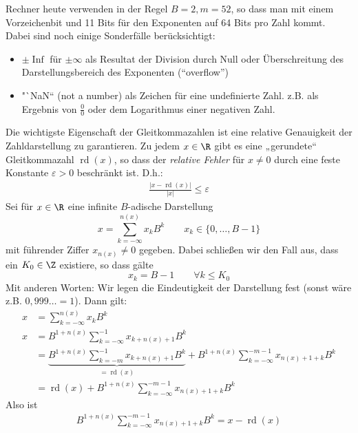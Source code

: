 \documentclass{mycourse}
\DeclareMathOperator{\Inf}{Inf}
\DeclareMathOperator{\rd}{rd}
\begin{document}
Rechner heute verwenden in der Regel $B=2, m=52$, so dass man mit  einem Vorzeichenbit und 11 Bits für den Exponenten auf 64 Bits pro Zahl kommt.
Dabei sind noch einige Sonderfälle berücksichtigt:

\begin{itemize}
\item
$\pm \Inf$ für $\pm\infty$ als Resultat der Division durch Null oder Überschreitung des Darstellungsbereich des Exponenten (“overflow”)
\item
"`NaN`` (not a number) als Zeichen für eine undefinierte Zahl. z.B. als Ergebnis von $\frac 00$ oder dem Logarithmus einer negativen Zahl.
\end{itemize}

Die wichtigste Eigenschaft der Gleitkommazahlen ist eine relative Genauigkeit der Zahldarstellung zu garantieren.
Zu jedem $x\in \R$ gibt es eine „gerundete“ Gleitkommazahl $\rd(x)$, so dass der \emph{relative Fehler} für $x\neq 0$ durch eine feste Konstante $\varepsilon >0$ beschränkt ist.
D.h.:
\begin{align}
\label{eps}
\frac{|x-\rd(x)|}{|x|}\le \varepsilon
\end{align}
Sei für $x\in \R$ eine infinite $B$-adische Darstellung
\[
x=\sum_{k=-\infty}^{n(x)}x_kB^k \qquad x_k\in \{0,\dotsc,B-1\}
\]
mit führender Ziffer $x_{n(x)}\neq 0$ gegeben.
Dabei schließen wir den Fall aus, dass ein $K_0\in \Z$ existiere, so dass gälte
\[
	x_k = B-1 \qquad \forall k\le K_0
\]
Mit anderen Worten:
Wir legen die Eindeutigkeit der Darstellung fest (sonst wäre z.B. $0,999\dotso = 1$).
Dann gilt:
\begin{align*}
	x&=\sum_{k=-\infty}^{n(x)}x_kB^k\\
	x&=B^{1+n(x)}\sum_{k=-\infty}^{-1}x_{k+n(x)+1}B^k \\
  &=\underbrace{B^{1+n(x)}\sum_{k=-m}^{-1}x_{k+n(x)+1}B^k}_{=\rd(x)} + B^{1+n(x)}\sum_{k=-\infty}^{-m-1}x_{n(x)+1+k}B^k \\
  &=\rd(x)+B^{1+n(x)}\sum_{k=-\infty}^{-m-1}x_{n(x)+1+k}B^k  
\end{align*}
Also ist
\begin{align}
	\label{eq:2.2}
	B^{1+n(x)}\sum_{k=-\infty}^{-m-1}x_{n(x)+1+k}B^k = x - \rd(x)
\end{align}
\end{document}
